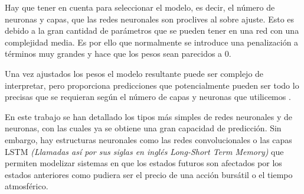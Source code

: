 \noindent Hay que tener en cuenta para seleccionar el modelo, es decir, el número de neuronas y capas, que las redes neuronales son proclives al sobre ajuste. Esto es debido a la gran cantidad de parámetros que se pueden tener en una red con una complejidad media. Es por ello que normalmente se introduce una penalización a términos muy grandes y hace que los pesos sean parecidos a 0.

\noindent Una vez ajustados los pesos el modelo resultante puede ser complejo de interpretar, pero proporciona predicciones que potencialmente pueden ser todo lo precisas que se requieran según el número de capas y neuronas que utilicemos . 


\noindent En este trabajo se han detallado los tipos más simples de redes neuronales y de neuronas, con las cuales ya se obtiene una gran capacidad de predicción. Sin embargo, hay estructuras neuronales como las redes convolucionales o las capas LSTM \textit{(Llamadas así por sus siglas en inglés Long-Short Term Memory)} que permiten modelizar sistemas en que los estados futuros son afectados por los estados anteriores como pudiera ser el precio de una acción bursátil o el tiempo atmosférico.
